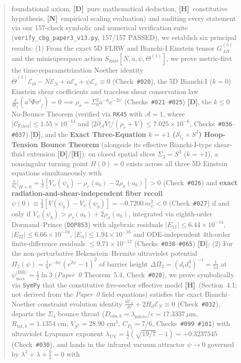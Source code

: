 \documentclass[11pt,a4paper]{article}
\newcommand{\catD}{\textbf{\textcolor{blue!75!black}{[D]}}}
\newcommand{\catH}{\textbf{\textcolor{orange!85!black}{[H]}}}
\newcommand{\catN}{\textbf{\textcolor{teal!75!black}{[N]}}}
\theoremstyle{plain}
\theoremstyle{definition}
\theoremstyle{remark}
\numberwithin{equation}{section}
\begin{document}
\begin{abstract}
foundational axiom, \catD\ pure mathematical deduction, \catH\ constitutive hypothesis, \catN\ empirical scaling evaluation) and auditing every statement via our 157-check symbolic and numerical verification suite (\allowbreak\texttt{verify\_cbg\_paper3\_v13.py}, 157/157 PASSED), we establish six principal results: (1) From the exact 5D FLRW and Bianchi-I Einstein tensor $G_{AB}^{(5)}$ and the minisuperspace action $S_{\text{mini}}[N,a,\psi,\Theta^{(1)}]$, we prove metric-first the time-reparametrization Noether identity $\dot{\Theta}^{(1)}\mathcal{E}_{\Theta} - N\dot{\mathcal{E}}_N + \dot{a}\mathcal{E}_a + \dot{\psi}\mathcal{E}_{\psi} \equiv 0$ (Check~\texttt{\#020}), the 5D Bianchi-I ($k = 0$) Einstein shear coefficients and traceless shear conservation law $\frac{d}{dt_1}(a^3\Phi\sigma^i_{\;j}) = 0 \implies \rho_{\sigma} = \Sigma_0^2 a^{-6}e^{-2\psi}$ (Checks~\texttt{\#021}--\texttt{\#025}) \catD, the $k \le 0$ No-Bounce Theorem (verified via \texttt{RK45} with $\mathcal{A} = 1$, where $|\mathcal{C}_{\text{Fried}}| \le 1.55 \times 10^{-14}$ and $|2\partial_{\mathcal{A}}V|/(\rho_r+V) \le 7.025 \times 10^{-6}$, Checks~\texttt{\#036}--\texttt{\#037}) \catD, and the \textbf{Exact Three-Equation $k = +1$ ($\mathcal{S}_{t_2} \times S^3$) Hoop-Tension Bounce Theorem} (alongside its effective Bianchi-I-type shear-fluid extension \catD/\catH): on closed spatial slices $\Sigma_3 = S^3$ ($k = +1$), a nonsingular turning point $H(0) = 0$ exists across all three 5D Einstein equations simultaneously with $\frac{\ddot{a}}{a_b}\big|_{H=0} = \frac{1}{3}[V_{\psi}(\psi_b) - \rho_r(a_b) - 2\rho_{\sigma}(a_b)] > 0$ (Check~\texttt{\#026}) and \textbf{exact radiation-and-shear-independent fiber recoil} $\ddot{\psi}(0) \equiv \frac{2}{3}[V(\psi_b) - V_{\psi}(\psi_b)] = -0.7200\,m_{\psi}^2 < 0$ (Check~\texttt{\#027}) if and only if $V_{\psi}(\psi_b) > \rho_r(a_b) + 2\rho_{\sigma}(a_b)$, integrated via eighth-order Dormand--Prince (\texttt{DOP853}) with algebraic residuals $|E_{11}| \le 6.44 \times 10^{-14}$, $|E_{22}| \le 6.66 \times 10^{-16}$, $|E_{ii}| \le 1.94 \times 10^{-16}$ and ODE-independent 4th-order finite-difference residuals $\le 9.71 \times 10^{-12}$ (Checks~\texttt{\#038}--\texttt{\#065}) \catD; (2) For the non-perturbative Bekenstein--Hermite ultraviolet potential $\Pi_2(\psi) = \frac{1}{8}e^{-6\psi}(e^{2\psi}-1)^2$ of barrier height $\Delta\Pi_2 = (d_t d_s^3)^{-1} = \frac{1}{54}$ at $\psi_{\max}^{\text{(BH)}} = \frac{1}{2}\ln 3$ (\textit{Paper~0} Theorem~5.4, Check~\texttt{\#028}), we prove symbolically via \texttt{SymPy} that the constitutive five-sector effective model \catH\ (Section~4.1; not derived from the \textit{Paper~0} field equations) satisfies the exact Bianchi--Noether constraint evolution identity $\frac{d\mathcal{E}_N}{d\tau} + 2H_d\mathcal{E}_N \equiv 0$ (Check~\texttt{\#032}), departs the $\Sigma_4$ bounce throat ($D_{\text{obs},b} = \lambda_{\text{micro}}/e = 17.3337\,\mu\text{m}$, $R_{\text{tot},b} = 1.1354\text{ cm}$, $V_{S^3} = 28.90\text{ cm}^3$, $C_{P_2} = 7/6$, Checks~\texttt{\#099}--\texttt{\#101}) with ultraviolet Lyapunov exponent $\lambda_{\text{UV}} = \frac{1}{2}(\sqrt{19/7}-1) = +0.3237545$ (Check~\texttt{\#030}), and lands in the infrared vacuum attractor $\psi \to 0$ governed by $\lambda^2 + \lambda + \frac{9}{2} = 0$ with 
\end{abstract}
\end{document}
